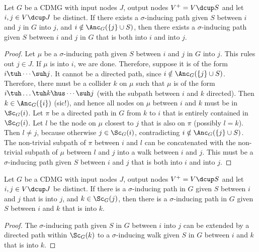 \begin{Lem}\label{lem:sigma-inducing_path_into_into}
  Let $G$ be a CDMG with input nodes $J$, output nodes $V^+ = V \dcup S$ and let $i,j \in V \dcup J$ be distinct.
  If there exists a $\sigma$-inducing path given $S$ between $i$ and $j$ in $G$ into $j$, and $i \notin \Anc_G(\{j\} \cup S)$, then there exists a $\sigma$-inducing path given $S$ between $i$ and $j$ in $G$ that is both into $i$ and into $j$.
\end{Lem}
\begin{proof}
  Let $\mu$ be a $\sigma$-inducing path given $S$ between $i$ and $j$ in $G$ into $j$.
  This rules out $j \in J$.
  If $\mu$ is into $i$, we are done.
  Therefore, suppose it is of the form $i \tuh \cdots \suh j$. 
  It cannot be a directed path, since $i \notin \Anc_G(\{j\} \cup S)$.
  Therefore, there must be a collider $k$ on $\mu$ such that $\mu$ is of the form $i \tuh \dots \tuh k \hus \cdots \suh j$
  (with the subpath between $i$ and $k$ directed).
  Then $k \in \Anc_G(\{i\})$ (sic!), and hence all nodes on $\mu$ between $i$ and $k$ must be in $\Sc_G(i)$.
  Let $\pi$ be a directed path in $G$ from $k$ to $i$ that is entirely contained in $\Sc_G(i)$.
  Let $l$ be the node on $\mu$ closest to $j$ that is also on $\pi$ (possibly $l = k$).
  Then $l \ne j$, because otherwise $j \in \Sc_G(i)$, contradicting $i \notin \Anc_G(\{j\} \cup S)$.
  The non-trivial subpath of $\pi$ between $i$ and $l$ can be concatenated with the non-trivial subpath of $\mu$ between $l$ and $j$ into a walk between $i$ and $j$.
  This must be a $\sigma$-inducing path given $S$ between $i$ and $j$ that is both into $i$ and into $j$.
\end{proof}

\begin{Lem}\label{lem:inducing_path_into_scc}
Let $G$ be a CDMG with input nodes $J$, output nodes $V^+ = V \dcup S$ and let $i,j \in V \dcup J$ be distinct.
If there is a $\sigma$-inducing path in $G$ given $S$ between $i$ and $j$ that is into $j$, and $k \in \Sc_G(j)$, then there is a $\sigma$-inducing path in $G$ given $S$ between $i$ and $k$ that is into $k$.
\end{Lem}
\begin{proof}
The $\sigma$-inducing path given $S$ in $G$ between $i$ into $j$ can be extended by a directed path within $\Sc_G(k)$ to a $\sigma$-inducing walk given $S$ in $G$ between $i$ and $k$ that is into $k$.
\end{proof}

